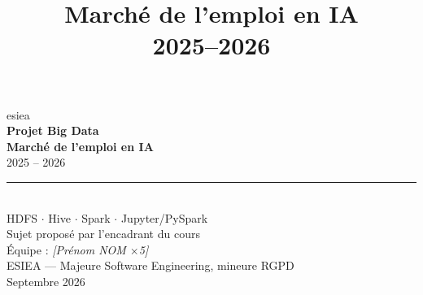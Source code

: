 \documentclass[11pt,a4paper]{report}
\title{\titlefont\Huge\bfseries\color{esienavy}Marché de l'emploi en IA\\[4pt]\Large 2025--2026}
\author{}
\date{}
\begin{document}
\begin{titlepage}
\vspace*{3cm}
\begin{center}
  {\titlefont\color{white}\Large esiea}\\[2.5cm]
  {\titlefont\color{white}\Huge\bfseries Projet Big Data\\[6pt] Marché de l'emploi en IA}\\[10pt]
  {\titlefont\color{white}\huge 2025 -- 2026}\\[18pt]
  {\color{esieaorange}\rule{6cm}{3pt}}\\[18pt]
  {\color{white}\large HDFS $\cdot$ Hive $\cdot$ Spark $\cdot$ Jupyter/PySpark}\\[40pt]
  {\color{white}\normalsize Sujet proposé par l'encadrant du cours}\\[4pt]
  {\color{white}\normalsize Équipe : \emph{[Prénom NOM $\times$5]}}\\[4pt]
  {\color{white}\normalsize ESIEA — Majeure Software Engineering, mineure RGPD}\\[4pt]
  {\color{white}\normalsize Septembre 2026}
\end{center}
\end{titlepage}
\restoregeometry

\tableofcontents
\clearpage
















\appendix

\end{document}
